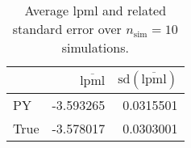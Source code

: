 \begin{table}[H]

\caption{Average lpml and related standard error over $n_{\text{sim}} = 10$ simulations.}
\centering
\begin{tabular}[t]{lrr}
\toprule
  & $\overbar{\text{lpml}}$ & $\text{sd}(\overbar{\text{lpml}})$\\
\midrule
PY & -3.593265 & 0.0315501\\
True & -3.578017 & 0.0303001\\
\bottomrule
\end{tabular}
\end{table}